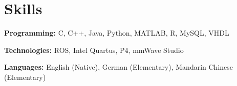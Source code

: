 \documentclass[letterpaper,11pt]{article}
\makeatletter
\newcommand{\resumeItem}[1]{
  \item\small{
    {#1 \vspace{-2pt}}
  }
}
\newcommand{\resumeProjectHeading}[2]{
    \vspace{-2pt}\item
    \begin{tabular*}{0.97\textwidth}{l@{\extracolsep{\fill}}r}
      \small#1 & #2 \\
    \end{tabular*}\vspace{-7pt}
}
\newcommand{\resumeSubHeadingListStart}{\begin{itemize}[leftmargin=0.15in, label={}]}
\newcommand{\resumeSubHeadingListEnd}{\end{itemize}}
\newcommand{\resumeItemListStart}{\begin{itemize}}
\newcommand{\resumeItemListEnd}{\end{itemize}\vspace{-5pt}}
\makeatother
\begin{document}
      
      




\section{Skills}
  \vspace{2pt}
  \resumeSubHeadingListStart
    \small{\item{
        \textbf{Programming:}{ C, C++, Java, Python, MATLAB, R, MySQL, VHDL} \\ \vspace{3pt}
        
        \textbf{Technologies:}{ ROS, Intel Quartus, P4, mmWave Studio} \\ \vspace{3pt}
        
        \textbf{Languages:}{ English (Native), German (Elementary), Mandarin Chinese (Elementary)}
        
    }}
  \resumeSubHeadingListEnd



\end{document}
